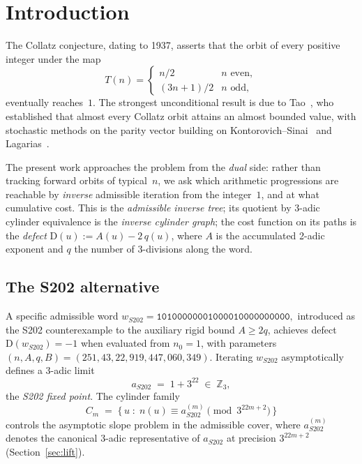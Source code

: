 \documentclass[11pt,a4paper]{article}
\theoremstyle{plain}
\theoremstyle{definition}
\newcommand{\Zp}[1]{\mathbb{Z}_{#1}}
\newcommand{\aS}{a_{S202}}
\newcommand{\aSat}{a_{S202}^{(m)}}
\newcommand{\wS}{w_{S202}}
\newcommand{\defect}{\mathrm{D}}
\begin{document}
\tableofcontents

\section{Introduction}\label{sec:intro}

The Collatz conjecture, dating to 1937, asserts that the orbit of
every positive integer under the map
\[
  T(n) =
    \begin{cases}
       n/2 & n \text{ even},\\
       (3n+1)/2 & n \text{ odd},
    \end{cases}
\]
eventually reaches~$1$. The strongest unconditional result is due to
Tao~\cite{tao2022}, who established that almost every Collatz orbit
attains an almost bounded value, with stochastic methods on the parity
vector building on Kontorovich--Sinai~\cite{kontorovich2002} and
Lagarias~\cite{lagarias1985}.

The present work approaches the problem from the \emph{dual} side:
rather than tracking forward orbits of typical~$n$, we ask which
arithmetic progressions are reachable by \emph{inverse} admissible
iteration from the integer~$1$, and at what cumulative cost. This is
the \emph{admissible inverse tree}; its quotient by 3-adic cylinder
equivalence is the \emph{inverse cylinder graph}; the cost function
on its paths is the \emph{defect}
$\defect(u) := A(u) - 2\,q(u)$, where $A$ is the accumulated 2-adic
exponent and $q$ the number of $3$-divisions along the word.

\subsection{The S202 alternative}

A specific admissible word
\(
  \wS = \mathtt{10100000001000010000000000},
\)
introduced as the S202 counterexample to the auxiliary rigid bound
$A \ge 2q$, achieves defect $\defect(\wS) = -1$ when evaluated from
$n_0 = 1$, with parameters
$(n, A, q, B) = (251, 43, 22, 919{,}447{,}060{,}349)$. Iterating
$\wS$ asymptotically defines a 3-adic limit
\[
  \aS \;=\; 1 + 3^{22} \;\in\; \Zp{3},
\]
the \emph{S202 fixed point}. The cylinder family
\[
  C_m \;=\; \bigl\{\, u \;:\; n(u) \equiv \aSat \pmod{3^{22m+2}} \,\bigr\}
\]
controls the asymptotic slope problem in the admissible cover, where
$\aSat$ denotes the canonical 3-adic representative of $\aS$ at
precision $3^{22m+2}$ (Section~\ref{sec:lift}).
\end{document}
